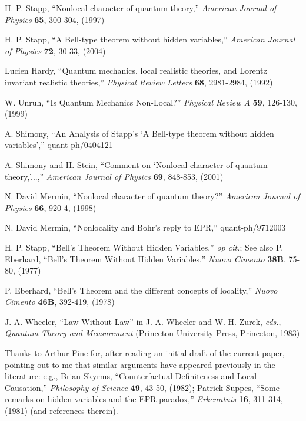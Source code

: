 \documentclass[aps,prc,onecolumn,12pt]{revtex4-2}
\begin{document}
\begin{thebibliography}{00}
  H. P. Stapp, ``Nonlocal character of quantum
  theory,'' \emph{American Journal of Physics} {\bf{65}}, 300-304, (1997)

  H. P. Stapp, ``A Bell-type theorem without hidden
  variables,'' \emph{American Journal of Physics} {\bf{72}}, 30-33, (2004)

  Lucien Hardy, ``Quantum mechanics, local realistic
  theories, and Lorentz invariant realistic theories,''
  \emph{Physical Review Letters} {\bf{68}}, 2981-2984, (1992)

 W. Unruh, ``Is Quantum Mechanics Non-Local?''
  \emph{Physical Review A} {\bf{59}}, 126-130, (1999)

 A. Shimony, ``An Analysis of Stapp's `A Bell-type
  theorem without hidden variables','' quant-ph/0404121

  A. Shimony and H. Stein,
  ``Comment on `Nonlocal character of quantum theory,'...,''
  \emph{American Journal of Physics} {\bf{69}}, 848-853, (2001)

  N. David Mermin, ``Nonlocal character of quantum
  theory?'' \emph{American Journal of Physics} {\bf{66}}, 920-4, (1998)

  N. David Mermin, ``Nonlocality and Bohr's reply to
  EPR,'' quant-ph/9712003

 H. P. Stapp, ``Bell's Theorem Without Hidden
  Variables,'' \emph{op cit.}; See also P. Eberhard, ``Bell's Theorem
  Without Hidden Variables,'' \emph{Nuovo Cimento} {\bf{38B}}, 75-80, (1977)

  P. Eberhard, ``Bell's Theorem and the different
  concepts of locality,'' \emph{Nuovo Cimento} {\bf{46B}}, 392-419, (1978)

  J. A. Wheeler, ``Law Without Law'' in
  J. A. Wheeler and W. H. Zurek, \emph{eds.}, \emph{Quantum Theory and
  Measurement}  (Princeton University Press, Princeton, 1983)

 Thanks to Arthur Fine for, after reading an initial
  draft of the current paper, pointing out to me that similar arguments
  have appeared previously in the literature:  e.g., Brian Skyrms,
  ``Counterfactual Definiteness and Local Causation,'' \emph{Philosophy of
  Science} {\bf{49}}, 43-50, (1982); Patrick Suppes, ``Some remarks on hidden
  variables and the EPR paradox,'' \emph{Erkenntnis} {\bf{16}},
  311-314, (1981) (and references therein).


\end{thebibliography}
\end{document}

